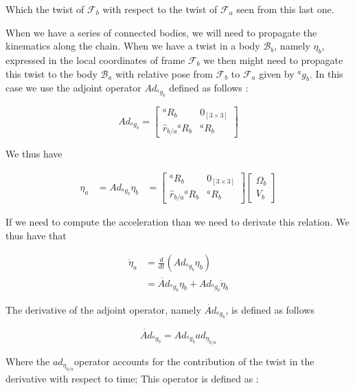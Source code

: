 \documentclass[12pt,a4paper]{book}
\newcommand{\Fa}{\ensuremath{\mathcal{F}_a}}
\newcommand{\Fb}{\ensuremath{\mathcal{F}_b}}
\newcommand{\Ba}{\ensuremath{\mathcal{B}_a}}
\newcommand{\Bb}{\ensuremath{\mathcal{B}_b}}
\newcommand{\agb}{\ensuremath{{^a g _b}}}
\newcommand{\aRb}{\ensuremath{{^a R _b}}}
\newcommand{\hatrba}{\ensuremath{{\hat{r}_{b/a}}}}
\newcommand{\etaa}{\ensuremath{{\eta_{a}}}}
\newcommand{\etab}{\ensuremath{{\eta_{b}}}}
\newcommand{\etaba}{\ensuremath{{\eta_{b/a}}}}
\newcommand{\dotetaa}{\ensuremath{{\dot{\eta}_{a}}}}
\newcommand{\dotetab}{\ensuremath{{\dot{\eta}_{b}}}}
\newcommand{\Adagb}{\ensuremath{Ad_{\agb}}}
\newcommand{\dotAdagb}{\ensuremath{\dot{Ad}_{\agb}}}
\newcommand{\adetaba}{\ensuremath{ad_{\etaba}}}
\begin{document}
Which the twist of \Fb{} with respect to the twist of \Fa{} seen from this last one.

When we have a series of connected bodies, we will need to propagate the kinematics along the chain. When we have a twist in a body \Bb{}, namely \etab{}, expressed in the local coordinates of frame \Fb{} we then might need to propagate this twist to the body \Ba{} with relative pose from \Fb{} to \Fa{} given by \agb{}. In this case we use the adjoint operator \Adagb{} defined as follows :


\begin{equation}
	\Adagb = 
	\begin{bmatrix}
		\aRb	&	0_{[3\times 3]}	\\
		\hatrba \aRb	&	\aRb
	\end{bmatrix}
\end{equation}

We thus have 

\begin{equation}
\begin{aligned}
	\etaa 	&= \Adagb \etab
			&=
			\begin{bmatrix}
				\aRb	&	0_{[3\times 3]}	\\
				\hatrba \aRb	&	\aRb
			\end{bmatrix}
			\begin{bmatrix}
				\Omega_b	\\
				V_b
			\end{bmatrix}
\end{aligned}
\end{equation}


If we need to compute the acceleration than we need to derivate this relation. We thus have that 

\begin{equation}
\begin{aligned}
	\dotetaa 	&= \frac{d}{dt}\left( \Adagb \etab \right) \\
				&= \dotAdagb \etab + \Adagb \dotetab
\end{aligned}
\end{equation}

The derivative of the adjoint operator, namely \dotAdagb{}, is defined as follows

\begin{equation}
	\dotAdagb = \Adagb \adetaba
\end{equation}

Where the \adetaba operator accounts for the contribution of the twist in the derivative with respect to time; This operator is defined as :
\end{document}
